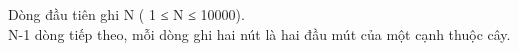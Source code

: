 Dòng đầu tiên ghi N ( 1 ≤ N ≤ 10000).
\\N-1 dòng tiếp theo, mỗi dòng ghi hai nút là hai đầu mút của một cạnh thuộc cây.

\